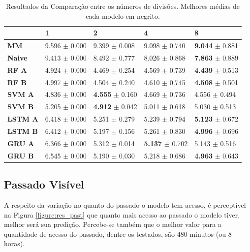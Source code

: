 \begin{table}[htbp]
    \begin{tabular*}{\linewidth}{@{\extracolsep{\fill}}lllll}
    \toprule
     & 
    \multicolumn{1}{l}{\textbf{1}} & 
    \multicolumn{1}{l}{\textbf{2}} &
    \multicolumn{1}{l}{\textbf{4}} &
    \multicolumn{1}{l}{\textbf{8}} \\
    \midrule
    \textbf{MM} & 9.596 $\pm$ 0.000 & 9.399 $\pm$ 0.008 & 9.098 $\pm$ 0.740 & \textbf{9.044} $\pm$ 0.881
    \\
    \midrule
    \textbf{Naive} & 9.413 $\pm$ 0.000 & 8.492 $\pm$ 0.777 & 8.026 $\pm$ 0.868 & \textbf{7.863} $\pm$ 0.889
    \\
    \midrule
    \textbf{RF A} & 4.924 $\pm$ 0.000 & 4.469 $\pm$ 0.254 & 4.569 $\pm$ 0.739 & \textbf{4.439} $\pm$ 0.513
    \\
    \midrule
    \textbf{RF B} & 4.997 $\pm$ 0.000 & 4.504 $\pm$ 0.240 & 4.610 $\pm$ 0.745 & \textbf{4.508} $\pm$ 0.501
    \\
    \midrule
    \textbf{SVM A} & 4.836 $\pm$ 0.000 & \textbf{4.555} $\pm$ 0.160 & 4.669 $\pm$ 0.736 & 4.556 $\pm$ 0.494
    \\
    \midrule
    \textbf{SVM B} & 5.205 $\pm$ 0.000 & \textbf{4.912} $\pm$ 0.042 & 5.011 $\pm$ 0.618 & 5.030 $\pm$ 0.513
    \\
    \midrule
    \textbf{LSTM A} & 6.418 $\pm$ 0.000 & 5.251 $\pm$ 0.279 & 5.239 $\pm$ 0.794 & \textbf{5.123} $\pm$ 0.672
    \\
    \midrule
    \textbf{LSTM B} & 6.412 $\pm$ 0.000 & 5.197 $\pm$ 0.156 & 5.261 $\pm$ 0.830 & \textbf{4.996} $\pm$ 0.696
    \\
    \midrule
    \textbf{GRU A} & 6.366 $\pm$ 0.000 & 5.312 $\pm$ 0.014 & \textbf{5.137} $\pm$ 0.702 & 5.143 $\pm$ 0.516
    \\
    \midrule
    \textbf{GRU B} & 6.545 $\pm$ 0.000 & 5.190 $\pm$ 0.030 & 5.218 $\pm$ 0.686 & \textbf{4.963} $\pm$ 0.643
    \\
    \bottomrule
    \end{tabular*}
    \label{table:res_split}
    \caption{Resultados da Comparação entre os números de divisões. Melhores médias de cada modelo em negrito.}
\end{table}

\subsection{Passado Visível}

A respeito da variação no quanto do passado o modelo tem acesso, é perceptível na Figura \ref{figure:res_past} que quanto mais acesso ao passado o modelo tiver, melhor será sua predição. Percebe-se também que o melhor valor para a quantidade de acesso do passado, dentre os testados, são 480 minutos (ou 8 horas). 

